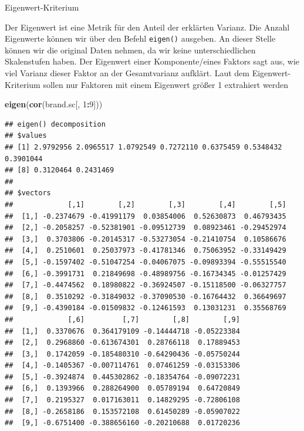 \documentclass[12pt,ngerman,a4paper,ignorenonframetext,]{beamer}
\newenvironment{Shaded}{\begin{snugshade}}{\end{snugshade}}
\newcommand{\DecValTok}[1]{\textcolor[rgb]{0.00,0.00,0.81}{#1}}
\newcommand{\KeywordTok}[1]{\textcolor[rgb]{0.13,0.29,0.53}{\textbf{#1}}}
\newcommand{\NormalTok}[1]{#1}
\newcommand{\OperatorTok}[1]{\textcolor[rgb]{0.81,0.36,0.00}{\textbf{#1}}}
\begin{document}
\begin{frame}{Eigenwert-Kriterium}
\protect\hypertarget{eigenwert-kriterium}{}

Der Eigenwert ist eine Metrik für den Anteil der erklärten Varianz. Die
Anzahl Eigenwerte können wir über den Befehl \texttt{eigen()} ausgeben.
An dieser Stelle können wir die original Daten nehmen, da wir keine
unterschiedlichen Skalenstufen haben. Der Eigenwert einer
Komponente\thinspace{}/\thinspace{}eines Faktors sagt aus, wie viel
Varianz dieser Faktor an der Gesamtvarianz aufklärt. Laut dem
Eigenwert-Kriterium sollen nur Faktoren mit einem Eigenwert größer 1
extrahiert werden

\begin{Shaded}
\begin{Highlighting}[]
\KeywordTok{eigen}\NormalTok{(}\KeywordTok{cor}\NormalTok{(brand.sc[, }\DecValTok{1}\OperatorTok{:}\DecValTok{9}\NormalTok{]))}
\end{Highlighting}
\end{Shaded}

\begin{verbatim}
## eigen() decomposition
## $values
## [1] 2.9792956 2.0965517 1.0792549 0.7272110 0.6375459 0.5348432 0.3901044
## [8] 0.3120464 0.2431469
## 
## $vectors
##             [,1]        [,2]        [,3]        [,4]        [,5]
##  [1,] -0.2374679 -0.41991179  0.03854006  0.52630873  0.46793435
##  [2,] -0.2058257 -0.52381901 -0.09512739  0.08923461 -0.29452974
##  [3,]  0.3703806 -0.20145317 -0.53273054 -0.21410754  0.10586676
##  [4,]  0.2510601  0.25037973 -0.41781346  0.75063952 -0.33149429
##  [5,] -0.1597402 -0.51047254 -0.04067075 -0.09893394 -0.55515540
##  [6,] -0.3991731  0.21849698 -0.48989756 -0.16734345 -0.01257429
##  [7,] -0.4474562  0.18980822 -0.36924507 -0.15118500 -0.06327757
##  [8,]  0.3510292 -0.31849032 -0.37090530 -0.16764432  0.36649697
##  [9,] -0.4390184 -0.01509832 -0.12461593  0.13031231  0.35568769
##             [,6]         [,7]        [,8]        [,9]
##  [1,]  0.3370676  0.364179109 -0.14444718 -0.05223384
##  [2,]  0.2968860 -0.613674301  0.28766118  0.17889453
##  [3,]  0.1742059 -0.185480310 -0.64290436 -0.05750244
##  [4,] -0.1405367 -0.007114761  0.07461259 -0.03153306
##  [5,] -0.3924874  0.445302862 -0.18354764 -0.09072231
##  [6,]  0.1393966  0.288264900  0.05789194  0.64720849
##  [7,]  0.2195327  0.017163011  0.14829295 -0.72806108
##  [8,] -0.2658186  0.153572108  0.61450289 -0.05907022
##  [9,] -0.6751400 -0.388656160 -0.20210688  0.01720236
\end{verbatim}

\end{frame}
\end{document}
